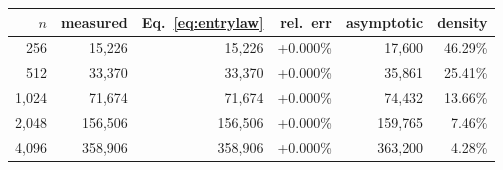 \begin{tabular}{rrrrrr}
\toprule
$n$ & measured & Eq.~\eqref{eq:entrylaw} & rel.\ err & asymptotic & density \\
\midrule
256 & 15{,}226 & 15{,}226 & +0.000\% & 17{,}600 & 46.29\% \\
512 & 33{,}370 & 33{,}370 & +0.000\% & 35{,}861 & 25.41\% \\
1{,}024 & 71{,}674 & 71{,}674 & +0.000\% & 74{,}432 & 13.66\% \\
2{,}048 & 156{,}506 & 156{,}506 & +0.000\% & 159{,}765 & 7.46\% \\
4{,}096 & 358{,}906 & 358{,}906 & +0.000\% & 363{,}200 & 4.28\% \\
\bottomrule
\end{tabular}
